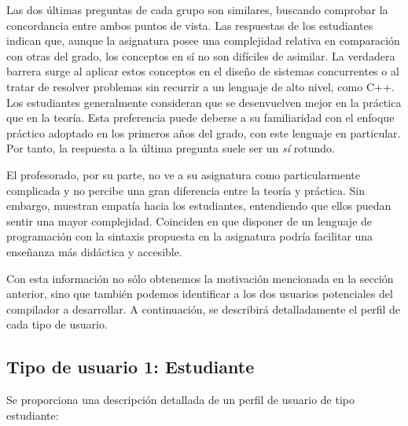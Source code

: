 Las dos últimas preguntas de cada grupo son similares, buscando comprobar la concordancia entre ambos puntos de vista. Las respuestas de los estudiantes indican que, aunque la asignatura posee una complejidad relativa en comparación con otras del grado, los conceptos en sí no son difíciles de asimilar. La verdadera barrera surge al aplicar estos conceptos en el diseño de sistemas concurrentes o al tratar de resolver problemas sin recurrir a un lenguaje de alto nivel, como C++. Los estudiantes generalmente consideran que se desenvuelven mejor en la práctica que en la teoría. Esta preferencia puede deberse a su familiaridad con el enfoque práctico adoptado en los primeros años del grado, con este lenguaje en particular. Por tanto, la respuesta a la última pregunta suele ser un \textit{sí} rotundo.

El profesorado, por su parte, no ve a su asignatura como particularmente complicada y no percibe una gran diferencia entre la teoría y práctica. Sin embargo, muestran empatía hacia los estudiantes, entendiendo que ellos puedan sentir una mayor complejidad. Coinciden en que disponer de un lenguaje de programación con la sintaxis propuesta en la asignatura podría facilitar una enseñanza más didáctica y accesible.

Con esta información no sólo obtenemos la motivación mencionada en la sección anterior, sino que también podemos identificar a los dos usuarios potenciales del compilador a desarrollar. A continuación, se describirá detalladamente el perfil de cada tipo de usuario.

\subsection{Tipo de usuario 1: Estudiante}
Se proporciona una descripción detallada de un perfil de usuario de tipo estudiante:

